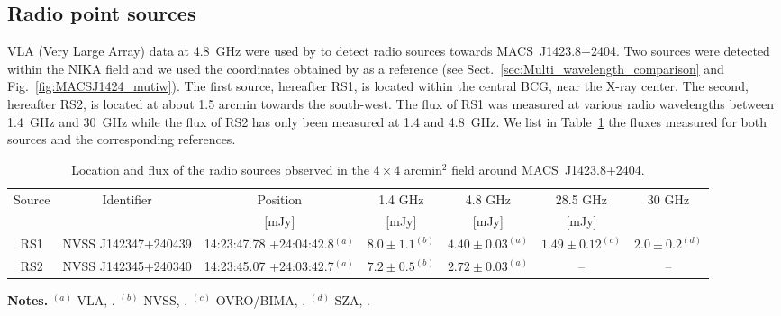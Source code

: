 \documentclass[twocolumn,traditabstract]{aa}
\begin{document}
\subsection{Radio point sources}
VLA (Very Large Array) data  at 4.8~GHz were used by \cite{laroque2003} to detect radio sources towards \mbox{MACS~J1423.8+2404}. Two sources were detected within the NIKA field and we used the coordinates obtained by \cite{laroque2003} as a reference (see Sect.~\ref{sec:Multi_wavelength_comparison} and Fig.~\ref{fig:MACSJ1424_mutiw}). The first source, hereafter RS1, is located within the central BCG, near the X-ray center. The second, hereafter RS2, is located at about 1.5 arcmin towards the south-west. The flux of RS1 was measured at various radio wavelengths between 1.4~GHz and 30~GHz while the flux of RS2 has only been measured at 1.4 and 4.8~GHz. We list in Table~\ref{tab:Radio_ps} the fluxes measured for both sources and the corresponding references. 
\begin{table}[h]
\caption{{\footnotesize Location and flux of the radio sources observed in the $4 \times 4$ arcmin$^2$ field around \mbox{MACS~J1423.8+2404}.}}
\begin{center}
\begin{tabular}{ccccccc}
\hline
\hline
Source & Identifier & Position & 1.4 GHz & 4.8 GHz & 28.5 GHz & 30 GHz \\
 &  & [mJy] & [mJy] & [mJy] & [mJy] \\
\hline
RS1 & NVSS J142347+240439 & 14:23:47.78 +24:04:42.8$^{(a)}$ & $8.0 \pm 1.1 ^{(b)}$ & $4.40 \pm 0.03 ^{(a)}$ & $1.49 \pm 0.12 ^{(c)}$ & $2.0 \pm 0.2 ^{(d)}$ \\
RS2 & NVSS J142345+240340 & 14:23:45.07 +24:03:42.7$^{(a)}$ & $7.2 \pm 0.5 ^{(b)}$ & $2.72 \pm 0.03 ^{(a)}$ &  -- & --  \\  
\hline
\end{tabular}
\end{center}
{\small {\bf Notes.} $^{(a)}$ VLA, \cite{laroque2003}. $^{(b)}$ NVSS, \cite{condon1998}. $^{(c)}$ OVRO/BIMA, \cite{coble2007}. $^{(d)}$ SZA, \cite{bonamente2012}.}
\label{tab:Radio_ps}
\end{table}
\end{document}
